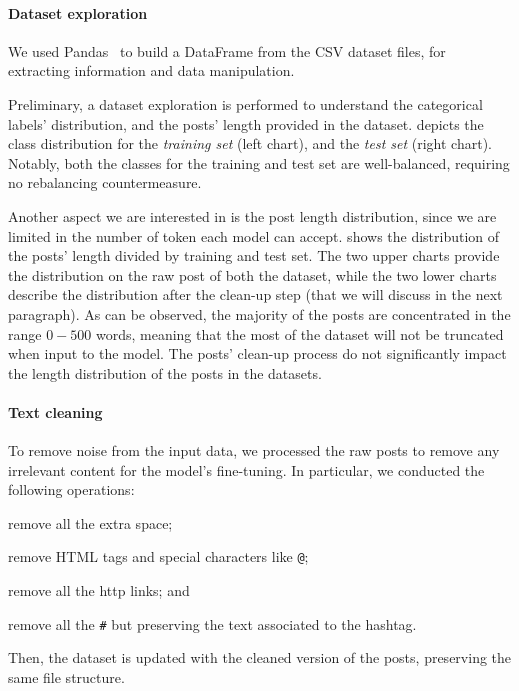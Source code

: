 \documentclass[11pt]{article}
\begin{document}
\paragraph{Dataset exploration}
We used Pandas~\cite{reback2020pandas} to build a DataFrame from the CSV dataset files,
for extracting information and data manipulation.

Preliminary,
a dataset exploration is performed to understand the categorical labels' distribution,
and the posts' length provided in the dataset.
%
 depicts the class distribution for the \emph{training set} (left chart),
and the \emph{test set} (right chart).
%
Notably,
both the classes for the training and test set are well-balanced,
requiring no rebalancing countermeasure.

Another aspect we are interested in is the post length distribution,
since we are limited in the number of token each model can accept.
%
 shows the distribution of the posts' length divided by training and test set.
%
The two upper charts provide the distribution on the raw post of both the dataset,
while the two lower charts describe the distribution after the clean-up step (that we will discuss in the next paragraph).
%
As can be observed,
the majority of the posts are concentrated in the range $0-500$ words,
meaning that the most of the dataset will not be truncated when input to the model.
%
The posts' clean-up process do not significantly impact the length distribution of the posts in the datasets.

\paragraph{Text cleaning}
To remove noise from the input data,
we processed the raw posts to remove any irrelevant content for the model's fine-tuning.
%
In particular,
we conducted the following operations:
\begin{enumerate*}[label=(\roman{*})]
  \item remove all the extra space;
  \item remove HTML tags and special characters like \texttt{@};
  \item remove all the http links; and
  \item remove all the \texttt{\#} but preserving the text associated to the hashtag.
\end{enumerate*}
Then,
the dataset is updated with the cleaned version of the posts,
preserving the same file structure.
\end{document}
